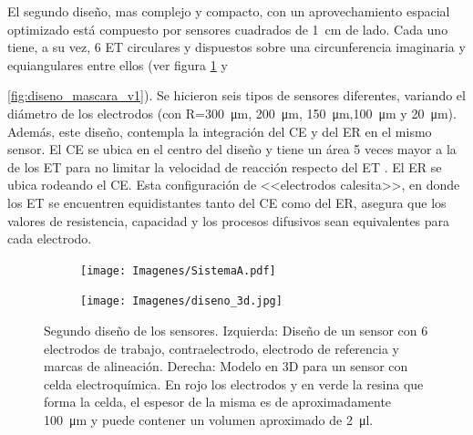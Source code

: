 		 	 El segundo diseño, mas complejo y compacto, con un aprovechamiento espacial optimizado está compuesto por sensores cuadrados de \SI{1}{\cm} de lado. Cada uno tiene, a su vez, 6 ET circulares y dispuestos sobre una circunferencia imaginaria y equiangulares entre ellos (ver figura \ref{fig:mascara_diseno_v2} y {\ref{fig:diseno_mascara_v1}). Se hicieron seis tipos de sensores diferentes, variando el diámetro de los electrodos (con R=\SI{300}{\um}, \SI{200}{\um}, \SI{150}{\um},\SI{100}{\um} y \SI{20}{\um}). Además, este diseño, contempla la integración del CE y del ER en el mismo sensor. El CE se ubica en el centro del diseño y tiene un área 5 veces mayor a la de los ET para no limitar la velocidad de reacción respecto del ET \cite{Wi2000}. El ER se ubica rodeando el CE. Esta configuración de <<electrodos calesita>>, en donde los ET se encuentren equidistantes tanto del CE como del ER, asegura que los valores de resistencia, capacidad y los procesos difusivos sean equivalentes para cada electrodo.

			     \begin{figure}[th!]
			 	    \begin{subfigure}[t]{0.395\textwidth}
			       	\texttt{[image: Imagenes/SistemaA.pdf]}
			    	\end{subfigure}
					\begin{subfigure}[t]{0.595\textwidth}
			        \texttt{[image: Imagenes/diseno\_3d.jpg]}
			        \end{subfigure}
			     	\caption[Segundo diseño y máscara de los sensores]{Segundo diseño de los sensores. Izquierda: Diseño de un sensor con 6 electrodos de trabajo, contraelectrodo, electrodo de referencia y marcas de alineación. Derecha: Modelo en 3D para un sensor con celda electroquímica. En rojo los electrodos y en verde la resina que forma la celda, el espesor de la misma es de aproximadamente \SI{100}{\um} y puede contener un volumen aproximado de \SI{2}{\ul}.}
			     	\label{fig:mascara_diseno_v2}
			     	\end{figure}
	   
}
